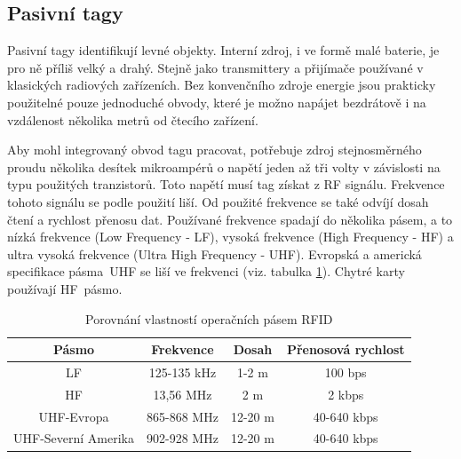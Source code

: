 \subsection{Pasivní tagy}
\label{pasivniTagy}
Pasivní tagy identifikují levné objekty. Interní zdroj, i ve formě malé baterie, je pro ně příliš velký a drahý. Stejně jako transmittery a přijímače používané v klasických radiových zařízeních. Bez konvenčního zdroje energie jsou prakticky použitelné pouze jednoduché obvody, které je možno napájet bezdrátově i na vzdálenost několika metrů od čtecího zařízení. 
\par 
Aby mohl integrovaný obvod tagu pracovat, potřebuje zdroj stejnosměrného proudu několika desítek mikroampérů o napětí jeden až tři volty v závislosti na typu použitých tranzistorů. Toto napětí musí tag získat z RF signálu\cite{The_RF_in_RFID}. Frekvence tohoto signálu se podle použití liší. Od použité frekvence se také odvíjí dosah čtení a rychlost přenosu dat. Používané frekvence spadají do několika pásem, a to nízká frekvence ({Low Frequency - LF}), vysoká frekvence ({High Frequency - HF}) a ultra vysoká frekvence ({Ultra High Frequency - UHF}). Evropská a americká specifikace pásma~UHF se liší ve frekvenci (viz. tabulka \ref{tabulka_pasem}). Chytré karty používají HF~pásmo\cite{Smart_Cards_Tokens_Security}. \par
\begin{table}[]
\begin{tabular}{cccc}
\hline
Pásmo               & Frekvence   & Dosah   & Přenosová rychlost \\ \hline
LF                  & 125-135 kHz & 1-2 m   & 100 bps            \\
HF                  & 13,56 MHz   & 2 m     & 2 kbps             \\
UHF-Evropa          & 865-868 MHz & 12-20 m & 40-640 kbps        \\
UHF-Severní Amerika & 902-928 MHz & 12-20 m & 40-640 kbps        \\ \hline
\end{tabular}
\caption{Porovnání vlastností operačních pásem RFID\cite{RFID_explained}\cite{The_RF_in_RFID}}
\label{tabulka_pasem}
\end{table}

